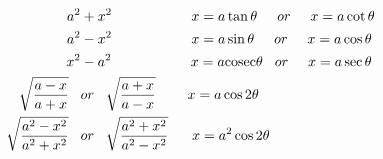 \begin{align*}
\hspace{30mm} a^2 &+ x^2 \hspace{20mm} x=a\tan\theta \hspace{5mm} or \hspace{5mm} x=a\cot\theta\\
\hspace{30mm} a^2 &- x^2 \hspace{20mm} x=a\sin\theta \hspace{5mm} or \hspace{5mm} x=a\cos\theta\\
\hspace{30mm} x^2 &- a^2 \hspace{20mm} x=a \mathrm{cosec}\theta \hspace{3mm} or \hspace{5mm} x=a\sec\theta \\
\hspace{25mm}\sqrt{\frac{a-x}{a+x}} \hspace{3mm} & or \hspace{3mm}\sqrt{\frac{a+x}{a-x}} \hspace{8mm} x=a\cos2\theta \hspace{5mm}\\
\hspace{25mm}\sqrt{\frac{a^2-x^2}{a^2+x^2}} \hspace{3mm} & or \hspace{3mm}\sqrt{\frac{a^2+x^2}{a^2-x^2}} \hspace{6mm} x=a^2\cos2\theta \hspace{5mm}
\end{align*}
